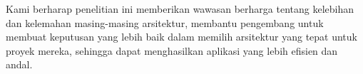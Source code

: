 \documentclass[conference]{IEEEtran}
\begin{document}
	Kami berharap penelitian ini memberikan wawasan berharga tentang kelebihan dan kelemahan masing-masing arsitektur, membantu pengembang untuk membuat keputusan yang lebih baik dalam memilih arsitektur yang tepat untuk proyek mereka, sehingga dapat menghasilkan aplikasi yang lebih efisien dan andal.
	
	
	\vspace{12pt}
	
\end{document}
